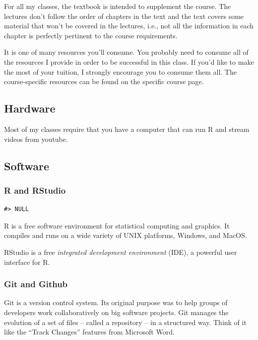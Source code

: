 For all my classes, the textbook is intended to supplement the course.
The lectures don't follow the order of chapters in the text and the text covers some material that won't be covered in the lectures, i.e., not all the information in each chapter is perfectly pertinent to the course requirements.

It is one of many resources you'll consume.
You probably need to consume all of the resources I provide in order to be successful in this class.
If you'd like to make the most of your tuition, I strongly encourage you to consume them all.
The course-specific resources can be found on the specific course page.

\hypertarget{hardware}{%
\subsection{Hardware}\label{hardware}}

Most of my classes require that you have a computer that can run R and stream videos from youtube.

\hypertarget{software}{%
\subsection{Software}\label{software}}

\hypertarget{r-and-rstudio}{%
\subsubsection{R and RStudio}\label{r-and-rstudio}}

\begin{verbatim}
#> NULL
\end{verbatim}

R is a free software environment for statistical computing and graphics. It compiles and runs on a wide variety of UNIX platforms, Windows, and MacOS.

RStudio is a free \emph{integrated development environment} (IDE), a powerful user interface for R.

\hypertarget{git-and-github}{%
\subsubsection{Git and Github}\label{git-and-github}}

Git is a version control system. Its original purpose was to help groups of developers work collaboratively on big software projects. Git manages the evolution of a set of files -- called a repository -- in a structured way. Think of it like the ``Track Changes'' features from Microsoft Word.

